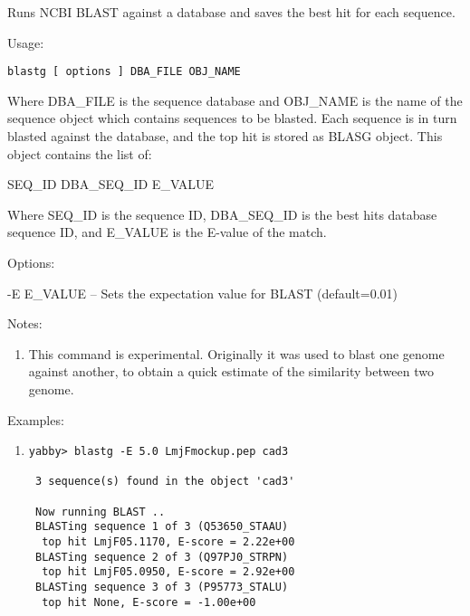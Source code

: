 
Runs NCBI BLAST against a database and saves the best
hit for each sequence.


\begin{description}


\item{Usage:}

{\tt blastg [ options ] DBA\_FILE OBJ\_NAME}

 Where DBA\_FILE is the sequence database and OBJ\_NAME
 is the name of the sequence object which contains
 sequences to be blasted. Each sequence is in turn
 blasted against the database, and the top hit is
 stored as BLASG object. This object contains the
 list of:

 SEQ\_ID DBA\_SEQ\_ID E\_VALUE

 Where SEQ\_ID is the sequence ID, DBA\_SEQ\_ID is the
 best hits database sequence ID, and E\_VALUE is the
 E-value of the match.


\item{Options:}
\begin{description}
\item -E E\_VALUE -- Sets the expectation value for BLAST (default=0.01)
\end{description}


\item{Notes:}
\begin{enumerate}
\item This command is experimental. Originally it was used
 to blast one genome against another, to obtain a quick
 estimate of the similarity between two genome.
\end{enumerate}


\item{Examples:}
\begin{enumerate}

\item
\begin{verbatim}
yabby> blastg -E 5.0 LmjFmockup.pep cad3

 3 sequence(s) found in the object 'cad3'

 Now running BLAST ..
 BLASTing sequence 1 of 3 (Q53650_STAAU)
  top hit LmjF05.1170, E-score = 2.22e+00
 BLASTing sequence 2 of 3 (Q97PJ0_STRPN)
  top hit LmjF05.0950, E-score = 2.92e+00
 BLASTing sequence 3 of 3 (P95773_STALU)
  top hit None, E-score = -1.00e+00
\end{verbatim}


\end{enumerate}
\end{description}
